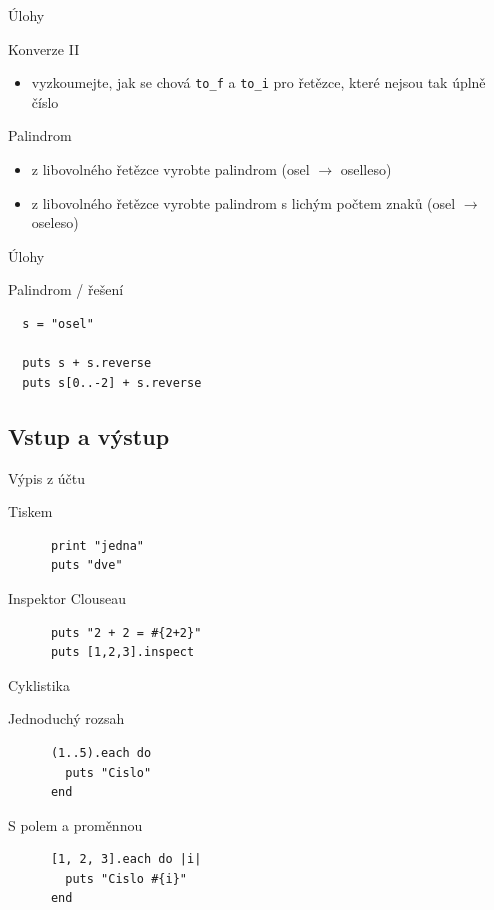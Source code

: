 \documentclass{beamer}
\begin{document}
\begin{frame}[fragile]{Úlohy}
  \begin{block}{Konverze II}
    \begin{itemize}
      \item vyzkoumejte, jak se chová \texttt{to\_f} a \texttt{to\_i} pro řetězce, které nejsou tak úplně číslo
    \end{itemize}
  \end{block}
  \pause
  \begin{block}{Palindrom}
    \begin{itemize}
      \item z libovolného řetězce vyrobte palindrom (osel $\to$ oselleso)
      \item z libovolného řetězce vyrobte palindrom s lichým počtem znaků (osel $\to$ oseleso)
    \end{itemize}
  \end{block}
\end{frame}

\begin{frame}[fragile]{Úlohy}
  \begin{block}{Palindrom / řešení}
\begin{verbatim}
  s = "osel"

  puts s + s.reverse
  puts s[0..-2] + s.reverse
\end{verbatim}
  \end{block}
\end{frame}

\subsection{Vstup a výstup}

\begin{frame}[fragile]{Výpis z účtu}
  \begin{block}{Tiskem}
    \begin{verbatim}
      print "jedna"
      puts "dve"
    \end{verbatim}
  \end{block}
  \pause
  \begin{block}{Inspektor Clouseau}
    \begin{verbatim}
      puts "2 + 2 = #{2+2}"
      puts [1,2,3].inspect
    \end{verbatim}
  \end{block}
\end{frame}

\begin{frame}[fragile]{Cyklistika}
  \begin{block}{Jednoduchý rozsah}
    \begin{verbatim}
      (1..5).each do
        puts "Cislo"
      end
    \end{verbatim}
  \end{block}
  \pause
  \begin{block}{S polem a proměnnou}
    \begin{verbatim}
      [1, 2, 3].each do |i|
        puts "Cislo #{i}"
      end
    \end{verbatim}
  \end{block}
\end{frame}
\end{document}
